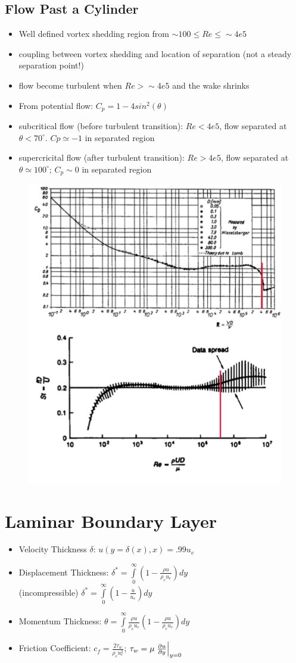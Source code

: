 \documentclass[a4paper]{article}
\begin{document}
    \subsection{Flow Past a Cylinder}
    \begin{itemize}
        \item Well defined vortex shedding region from $ \sim100 \leq Re \leq \sim4e5$
        \item coupling between vortex shedding and location of separation (not a steady separation point!)
        \item flow become turbulent when $Re > \sim 4e5$ and the wake shrinks
        \item From potential flow: $C_p = 1 - 4sin^2(\theta)$
        \item subcritical flow (before turbulent transition): $Re < 4e5$, flow separated at $\theta < 70^\circ$. $Cp \simeq -1$ in separated region
        \item supercricital flow (after turbulent transition): $Re > 4e5$, flow separated at $\theta \simeq 100^\circ$; $C_p \sim  0$ in separated region
    \end{itemize}
    \begin{figure}[H]
        \centering
        \includegraphics[width=.5\textwidth]{images/cylinder-drag-vortex-shedding.png}
    \end{figure}

\section{Laminar Boundary Layer}
    \begin{itemize}
        \item Velocity Thickness $\delta$: $u\left( y=\delta(x),x \right) = .99 u_e$
        \item Displacement Thickness: $\delta^* = \int\limits_0^\infty \left( 1 - \frac{\rho u}{\rho_e u_e} \right) dy$ \\
        (incompressible) $\delta^* = \int\limits_0^\infty \left( 1 - \frac{u}{u_e} \right) dy$
        \item Momentum Thickness: $\theta = \int\limits_0^\infty \frac{\rho u}{\rho_e u_e}\left( 1 - \frac{\rho u}{\rho_e u_e} \right) dy$
        \item Friction Coefficient: $c_f = \frac{2 \tau_w}{\rho_e u_e^2}$; $\tau_w = \mu \left.\frac{\partial u}{\partial y}\right|_{y=0}$
    \end{itemize}
\end{document}
